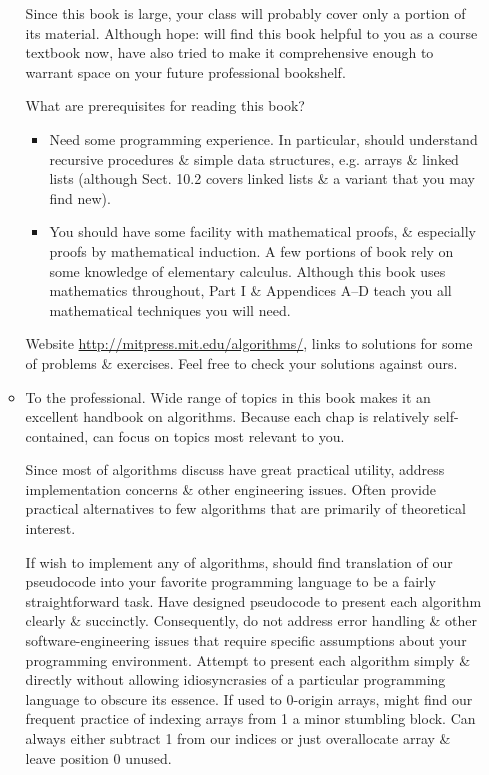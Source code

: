 \documentclass{article}
\begin{document}
\begin{itemize}
\begin{itemize}
		Since this book is large, your class will probably cover only a portion of its material. Although hope: will find this book helpful to you as a course textbook now, have also tried to make it comprehensive enough to warrant space on your future professional bookshelf.
		
		What are prerequisites for reading this book?
		\begin{itemize}
			\item Need some programming experience. In particular, should understand recursive procedures \& simple data structures, e.g. arrays \& linked lists (although Sect. 10.2 covers linked lists \& a variant that you may find new).
			\item You should have some facility with mathematical proofs, \& especially proofs by mathematical induction. A few portions of book rely on some knowledge of elementary calculus. Although this book uses mathematics throughout, Part I \& Appendices A--D teach you all mathematical techniques you will need.
		\end{itemize}
		Website \url{http://mitpress.mit.edu/algorithms/}, links to solutions for some of problems \& exercises. Feel free to check your solutions against ours.		
		\item {\sf To the professional.} Wide range of topics in this book makes it an excellent handbook on algorithms. Because each chap is relatively self-contained, can focus on topics most relevant to you.
		
		Since most of algorithms discuss have great practical utility, address implementation concerns \& other engineering issues. Often provide practical alternatives to few algorithms that are primarily of theoretical interest.
		
		If wish to implement any of algorithms, should find translation of our pseudocode into your favorite programming language to be a fairly straightforward task. Have designed pseudocode to present each algorithm clearly \& succinctly. Consequently, do not address error handling \& other software-engineering issues that require specific assumptions about your programming environment. Attempt to present each algorithm simply \& directly without allowing idiosyncrasies of a particular programming language to obscure its essence. If used to 0-origin arrays, might find our frequent practice of indexing arrays from 1 a minor stumbling block. Can always either subtract 1 from our indices or just overallocate array \& leave position 0 unused.
		

\end{itemize}
\end{itemize}
\end{document}
